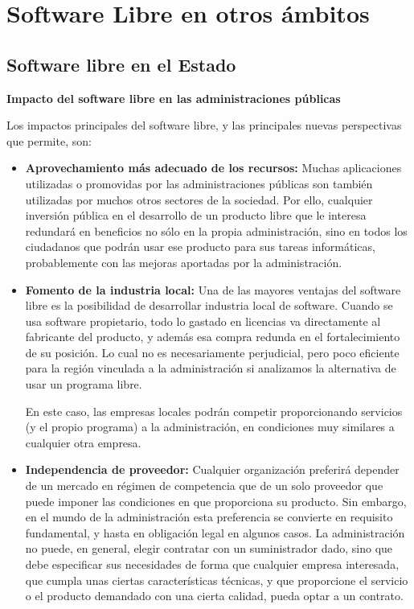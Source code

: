 \chapter{Software Libre en otros ámbitos}

\section{Software libre en el Estado}
{\bf Impacto del software libre en las administraciones públicas} \newline

Los impactos principales del software libre, y las principales nuevas perspectivas que permite, son:

\begin{itemize}
\item  \textbf{Aprovechamiento más adecuado de los recursos:} Muchas aplicaciones utilizadas o promovidas por las administraciones públicas son también utilizadas por muchos otros sectores de la sociedad. Por ello, cualquier inversión pública en el desarrollo de un producto libre que le interesa redundará en beneficios no sólo en la propia administración, sino en todos los ciudadanos que podrán usar ese producto para sus tareas informáticas, probablemente con las mejoras aportadas por la administración.
\item  \textbf{Fomento de la industria local:} Una de las mayores ventajas del software libre es la posibilidad de desarrollar industria local de software. Cuando se usa software propietario, todo lo gastado en licencias va directamente al fabricante del producto, y además esa compra redunda en el fortalecimiento de su posición. Lo cual no es necesariamente perjudicial, pero poco eficiente para la región vinculada a la administración si analizamos la alternativa de usar un programa libre.

En este caso, las empresas locales podrán competir proporcionando servicios (y el propio programa) a la administración, en condiciones muy similares a cualquier otra empresa.
\item \textbf{Independencia de proveedor:} Cualquier organización preferirá depender de un mercado en régimen de competencia que de un solo proveedor que puede imponer las condiciones en que proporciona su producto. Sin embargo, en el mundo de la administración esta preferencia se convierte en requisito fundamental, y hasta en obligación legal en algunos casos. La administración no puede, en general, elegir contratar con un suministrador dado, sino que debe especificar sus necesidades de forma que cualquier empresa interesada, que cumpla unas ciertas características técnicas, y que proporcione el servicio o el producto demandado con una cierta calidad, pueda optar a un contrato.


\end{itemize}
